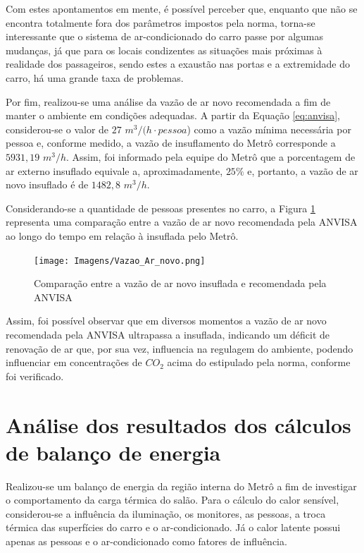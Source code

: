 \documentclass[acronym,symbols,table]{fei}
\begin{document}
Com estes apontamentos em mente, é possível perceber que, enquanto que não se encontra totalmente fora dos parâmetros impostos pela norma, torna-se interessante que o sistema de ar-condicionado do carro passe por algumas mudanças, já que para os locais condizentes as situações mais próximas à realidade dos passageiros, sendo estes a exaustão nas portas e a extremidade do carro, há uma grande taxa de problemas.

Por fim, realizou-se uma análise da vazão de ar novo recomendada a fim de manter o ambiente em condições adequadas. A partir da Equação \ref{eq:anvisa}, considerou-se o valor de $27$ $m^3/(h\cdot{pessoa}$) como a vazão mínima necessária por pessoa e, conforme medido, a vazão de insuflamento do Metrô corresponde a $5931,19$ $m^3/h$. Assim, foi informado pela equipe do Metrô que a porcentagem de ar externo insuflado equivale a, aproximadamente, $25\%$ e, portanto, a vazão de ar novo insuflado é de $1482,8$ $m^3/h$.

Considerando-se a quantidade de pessoas presentes no carro, a Figura \ref{fig:Vazao_Ar_novo} representa uma comparação entre a vazão de ar novo recomendada pela ANVISA ao longo do tempo em relação à insuflada pelo Metrô. 

\begin{figure}[!htb]
    \centering
    \caption{Comparação entre a vazão de ar novo insuflada e recomendada pela ANVISA}
    \texttt{[image: Imagens/Vazao\_Ar\_novo.png]}
    \label{fig:Vazao_Ar_novo}
\end{figure}

\newpage

Assim, foi possível observar que em diversos momentos a vazão de ar novo recomendada pela ANVISA ultrapassa a insuflada, indicando um déficit de renovação de ar que, por sua vez, influencia na regulagem do ambiente, podendo influenciar em concentrações de ${CO}_{2}$ acima do estipulado pela norma, conforme foi verificado.

\section{Análise dos resultados dos cálculos de balanço de energia} \label{equações}

Realizou-se um balanço de energia da região interna do Metrô a fim de investigar o comportamento da carga térmica do salão. Para o cálculo do calor sensível, considerou-se a influência da iluminação, os monitores, as pessoas, a troca térmica das superfícies do carro e o ar-condicionado. Já o calor latente possui apenas as pessoas e o ar-condicionado como fatores de influência.
\end{document}
